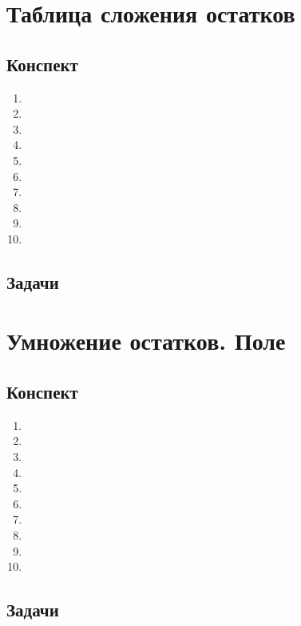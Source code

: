 

\section{Таблица сложения остатков}

\subsection{Конспект}
\begin{enumerate}\setlength{\itemsep}{1pt}
\item 
\item 
\item 
\item 
\item 
\item 
\item 
\item 
\item 
\item 
\end{enumerate}
\subsection{Задачи}




\section{Умножение остатков. Поле}

\subsection{Конспект}
\begin{enumerate}\setlength{\itemsep}{1pt}
\item 
\item 
\item 
\item 
\item 
\item 
\item 
\item 
\item 
\item 
\end{enumerate}
\subsection{Задачи}



